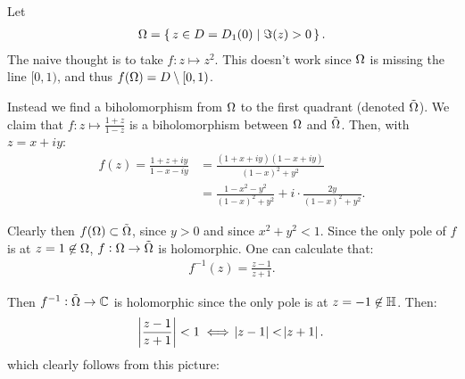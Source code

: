 \begin{example}
Let
\begin{align*}
	\Omega = \set{ z \in D = D_1(0) \mid \Im(z) > 0}.
\end{align*}
The naive thought is to take $f:z \mapsto z^2$. This doesn't work since $\Omega$ is missing the line $[0,1)$, and thus $f(\Omega) = D \setminus [0,1)$.

Instead we find a biholomorphism from $\Omega$ to the first quadrant (denoted $\Tilde{\Omega}$). We claim that $f: z \mapsto \frac{1+z}{1-z}$ is a biholomorphism between $\Omega$ and $\Tilde{\Omega}$. Then, with $z = x + iy$:
\begin{align*}
    f(z) = \frac{1+z+iy}{1-x-iy} &= \frac{(1+x+iy)(1-x+iy)}{(1-x)^2 + y^2}\\
    &= \frac{1-x^2-y^2}{(1-x)^2 + y^2} + i \cdot \frac{2y}{(1-x)^2 + y^2}.
\end{align*}

Clearly then $f(\Omega) \subset \Tilde{\Omega}$, since $y >0$ and since $x^2+y^2 <1$. Since the only pole of $f$ is at $z=1 \not\in \Omega$, $f: \Omega \to \Tilde{\Omega}$ is holomorphic. One can calculate that:
\begin{align*}
    f^{-1}(z) = \frac{z-1}{z+1}.
\end{align*}

Then $f^{-1}: \Tilde{\Omega} \to \mathbb{C}$ is holomorphic since the only pole is at $z=-1 \not\in \mathbb{H}$. Then:
\begin{align*}
    \abs{\frac{z-1}{z+1}} < 1 \iff \abs{z-1} < \abs{z+1}.
\end{align*}
which clearly follows from this picture:

\begin{center}
\end{center}


\end{example}

